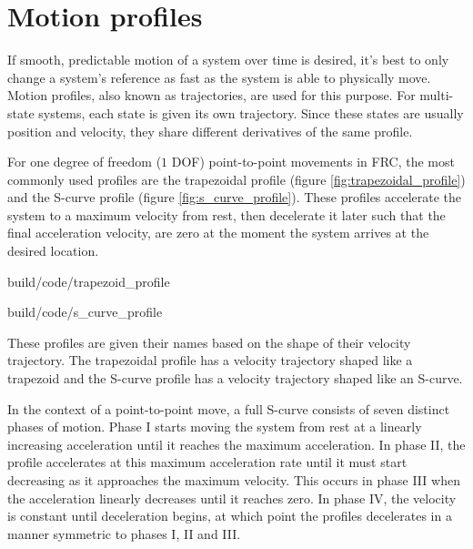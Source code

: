 \section{Motion profiles}

If smooth, predictable motion of a system over time is desired, it's best to
only change a system's reference as fast as the system is able to physically
move. Motion profiles, also known as trajectories, are used for this purpose.
For multi-state systems, each state is given its own trajectory. Since these
states are usually position and velocity, they share different derivatives of
the same profile.

For one degree of freedom ($1$ DOF) point-to-point movements in FRC, the most
commonly used profiles are the trapezoidal profile (figure
\ref{fig:trapezoidal_profile}) and the S-curve profile (figure
\ref{fig:s_curve_profile}). These profiles accelerate the system to a maximum
velocity from rest, then decelerate it later such that the final acceleration
velocity, are zero at the moment the system arrives at the desired location.

\begin{bookfigure}
  \begin{minisvg}{build/code/trapezoid_profile}
    \caption{Trapezoidal profile}
    \label{fig:trapezoidal_profile}
  \end{minisvg}
  \hfill
  \begin{minisvg}{build/code/s_curve_profile}
    \caption{S-curve profile}
    \label{fig:s_curve_profile}
  \end{minisvg}
\end{bookfigure}

These profiles are given their names based on the shape of their velocity
trajectory. The trapezoidal profile has a velocity trajectory shaped like a
trapezoid and the S-curve profile has a velocity trajectory shaped like an
S-curve.

In the context of a point-to-point move, a full S-curve consists of seven
distinct phases of motion. Phase I starts moving the system from rest at a
linearly increasing acceleration until it reaches the maximum acceleration. In
phase II, the profile accelerates at this maximum acceleration rate until it
must start decreasing as it approaches the maximum velocity. This occurs in
phase III when the acceleration linearly decreases until it reaches zero. In
phase IV, the velocity is constant until deceleration begins, at which point the
profiles decelerates in a manner symmetric to phases I, II and III.

